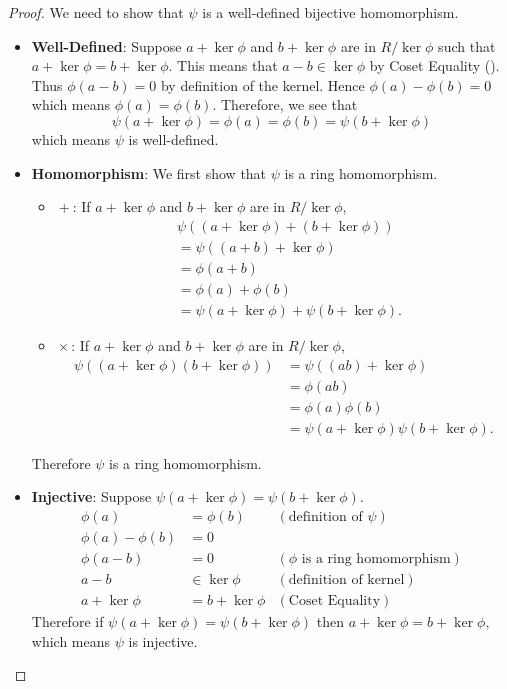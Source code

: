 \begin{proof}
    We need to show that $\psi$ is a well-defined bijective homomorphism.
    \begin{itemize}
        \item \textbf{Well-Defined}: Suppose $a + \ker\phi$ and $b + \ker\phi$ are in $R/\ker\phi$ such that $a + \ker\phi = b+\ker\phi$. This means that $a - b \in \ker\phi$ by Coset Equality (). Thus $\phi(a-b) = 0$ by definition of the kernel. Hence $\phi(a) - \phi(b) = 0$ which means $\phi(a) = \phi(b)$. Therefore, we see that
        \[
            \psi(a + \ker\phi) = \phi(a) = \phi(b) = \psi(b + \ker\phi)
        \]
        which means $\psi$ is well-defined.

        \item \textbf{Homomorphism}: We first show that $\psi$ is a ring homomorphism.
        \begin{itemize}
            \item $\boxed{+}$: If $a + \ker\phi$ and $b + \ker\phi$ are in $R/\ker\phi$,
            \begin{align*}
                &\psi((a + \ker\phi)+(b+\ker\phi))\\
                &= \psi((a+b)+\ker\phi)\\
                &= \phi(a+b)\\
                &= \phi(a) + \phi(b)\\
                &= \psi(a + \ker\phi) + \psi(b + \ker\phi).
            \end{align*}
            \item $\boxed{\times}$: If $a + \ker\phi$ and $b + \ker\phi$ are in $R/\ker\phi$,
            \begin{align*}
                \psi((a + \ker\phi)(b+\ker\phi)) &= \psi((ab)+\ker\phi)\\
                &= \phi(ab)\\
                &= \phi(a)\phi(b)\\
                &= \psi(a + \ker\phi)\psi(b + \ker\phi).
            \end{align*}
        \end{itemize}
        Therefore $\psi$ is a ring homomorphism.

        \item \textbf{Injective}: Suppose $\psi(a+\ker\phi) = \psi(b+\ker\phi)$.
        \begin{align*}
            \phi(a) &= \phi(b) & (\text{definition of }\psi)\\
            \phi(a) - \phi(b) &= 0\\
            \phi(a-b) &= 0 & (\phi \text{ is a ring homomorphism})\\
            a - b &\in \ker\phi & (\text{definition of kernel})\\
            a + \ker\phi &= b + \ker\phi & (\text{Coset Equality})
        \end{align*}
        Therefore if $\psi(a+\ker\phi) = \psi(b+\ker\phi)$ then $a+\ker\phi = b+\ker\phi$, which means $\psi$ is injective.


\end{itemize}
\end{proof}
